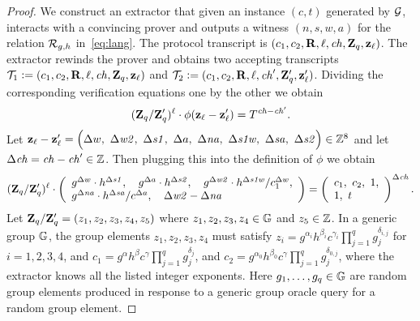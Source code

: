 \documentclass[11pt]{article}
\begin{document}
\begin{proof}
We construct an extractor that given an instance $(c,t)$ 
generated by ${\cal G}$,
interacts with a convincing prover and outputs a witness $(n, s, w, a)$ 
for the relation ${\cal R}_{g,h}$ in~\eqref{eq:lang}. 
The protocol transcript is $(c_1, c_2, \mathbf{R}, \ell, \mathit{ch}, \mathbf{Z}_q, \mathbf{z}_\ell)$.
The extractor rewinds the prover and obtains two
accepting transcripts
${\cal T}_1 \mathrel{\mathop:}= (c_1, c_2, \mathbf{R}, \ell, \mathit{ch}, \mathbf{Z}_q, \mathbf{z}_\ell)$
and 
${\cal T}_2 \mathrel{\mathop:}= (c_1, c_2, \mathbf{R}, \ell, \mathit{ch}', \mathbf{Z}_q', \mathbf{z}_\ell')$.
Dividing the corresponding verification equations one by the other
we obtain
\[   (\mathbf{Z}_q / \mathbf{Z}_q')^\ell \cdot \phi(\mathbf{z}_\ell - \mathbf{z}_\ell') = 
          T^{\mathit{ch} - \mathit{ch}'}. \]
Let $\zv_\ell - \zv_\ell' = \Big(\Delta w,\ \Delta \mathit{w2},\ \Delta \mathit{s1},\ \Delta a,\ \Delta \mathit{na},\ \Delta \mathit{s1w},\ \Delta \mathit{sa},\ \Delta \mathit{s2} \Big) \in \ZZ^8$ and let $\Delta \mathit{ch} = \mathit{ch} - \mathit{ch}' \in \mathbb Z$.
Then plugging this into the definition of $\phi$ we obtain
\begin{equation} \label{eq:messy}
      (\Zv_q / \Zv_q')^\ell \cdot
      \left(\begin{array}{l}
       g^{\Delta w} \cdot h^{\Delta \mathit{s1}},\ \ \ 
       g^{\Delta a} \cdot h^{\Delta \mathit{s2}},\ \ \ 
       g^{\Delta \mathit{w2}} \cdot h^{\Delta \mathit{s1w}} / c_1^{\Delta w}, \\
       g^{\Delta \mathit{na}} \cdot h^{\Delta \mathit{sa}} / c^{\Delta a},\ \ \ 
       \Delta \mathit{w2} - \Delta \mathit{na}\ 
       \end{array} \right)
          = \left(\begin{array}{l}c_1, \ c_2, \ 1, \\ 1,\ t \end{array}\right)^{\Delta \mathit{ch}}.
\end{equation}
Let $\mathbf{Z}_q / \mathbf{Z}_q' = (z_1, z_2, z_3, z_4, z_5)$ 
where $z_1, z_2, z_3, z_4 \in \mathbb G$ and $z_5 \in \mathbb Z$.  
In a generic group $\mathbb G$, the group elements $z_1, z_2, z_3, z_4$ 
must satisfy $z_i = g^{\alpha_i} h^{\beta_i} c^{\gamma_i} \prod_{j=1}^q g_j^{\delta_{i,j}}$
for $i=1,2,3,4$, 
and $c_1 = g^{\alpha} h^{\beta} c^\gamma \prod_{j=1}^q g_j^{\delta_{j}}$,
and $c_2 = g^{\alpha_0} h^{\beta_0} c^\gamma \prod_{j=1}^q g_j^{\delta_{0,j}}$,
where the extractor knows all the listed integer exponents.
Here $g_1,\ldots,g_q \in \mathbb G$ are random group elements produced in response
to a generic group oracle query for a random group element. 


\end{proof}
\end{document}
